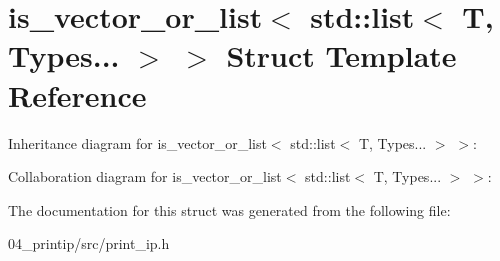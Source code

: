 \hypertarget{structis__vector__or__list_3_01std_1_1list_3_01T_00_01Types_8_8_8_01_4_01_4}{}\section{is\+\_\+vector\+\_\+or\+\_\+list$<$ std\+:\+:list$<$ T, Types... $>$ $>$ Struct Template Reference}
\label{structis__vector__or__list_3_01std_1_1list_3_01T_00_01Types_8_8_8_01_4_01_4}


Inheritance diagram for is\+\_\+vector\+\_\+or\+\_\+list$<$ std\+:\+:list$<$ T, Types... $>$ $>$\+:


Collaboration diagram for is\+\_\+vector\+\_\+or\+\_\+list$<$ std\+:\+:list$<$ T, Types... $>$ $>$\+:


The documentation for this struct was generated from the following file\+:\begin{DoxyCompactItemize}
\item 
04\+\_\+printip/src/print\+\_\+ip.\+h\end{DoxyCompactItemize}
